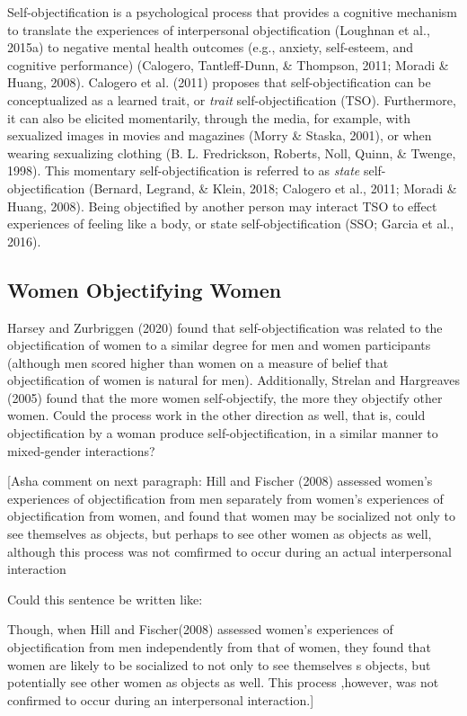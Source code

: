 \documentclass[man]{apa6}
\begin{document}
Self-objectification is a psychological process that provides a
cognitive mechanism to translate the experiences of interpersonal
objectification (Loughnan et al., 2015a) to negative mental health
outcomes (e.g., anxiety, self-esteem, and cognitive performance)
(Calogero, Tantleff-Dunn, \& Thompson, 2011; Moradi \& Huang, 2008).
Calogero et al. (2011) proposes that self-objectification can be
conceptualized as a learned trait, or \emph{trait} self-objectification
(TSO). Furthermore, it can also be elicited momentarily, through the
media, for example, with sexualized images in movies and magazines
(Morry \& Staska, 2001), or when wearing sexualizing clothing (B. L.
Fredrickson, Roberts, Noll, Quinn, \& Twenge, 1998). This momentary
self-objectification is referred to as \emph{state} self-objectification
(Bernard, Legrand, \& Klein, 2018; Calogero et al., 2011; Moradi \&
Huang, 2008). Being objectified by another person may interact TSO to
effect experiences of feeling like a body, or state self-objectification
(SSO; Garcia et al., 2016).

\subsection{Women Objectifying Women}\label{women-objectifying-women}

Harsey and Zurbriggen (2020) found that self-objectification was related
to the objectification of women to a similar degree for men and women
participants (although men scored higher than women on a measure of
belief that objectification of women is natural for men). Additionally,
Strelan and Hargreaves (2005) found that the more women self-objectify,
the more they objectify other women. Could the process work in the other
direction as well, that is, could objectification by a woman produce
self-objectification, in a similar manner to mixed-gender interactions?

{[}Asha comment on next paragraph: Hill and Fischer (2008) assessed
women's experiences of objectification from men separately from women's
experiences of objectification from women, and found that women may be
socialized not only to see themselves as objects, but perhaps to see
other women as objects as well, although this process was not comfirmed
to occur during an actual interpersonal interaction

Could this sentence be written like:

Though, when Hill and Fischer(2008) assessed women's experiences of
objectification from men independently from that of women, they found
that women are likely to be socialized to not only to see themselves s
objects, but potentially see other women as objects as well. This
process ,however, was not confirmed to occur during an interpersonal
interaction.{]}
\end{document}
